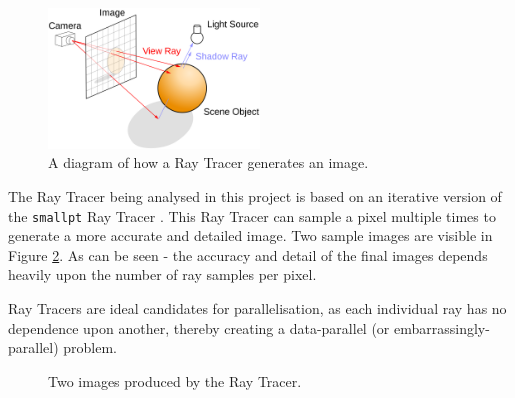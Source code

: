 \documentclass[journal,transmag]{IEEEtran}
\begin{document}
		\begin{figure}[h]
			\centering
			\includegraphics[width = 0.5\textwidth]{raytracerDiagram}
			\caption{A diagram of how a Ray Tracer generates an image.}
			\label{fig_ray_tracer_diagram}
		\end{figure}
	
		The Ray Tracer being analysed in this project is based on an iterative version of the \texttt{smallpt} Ray Tracer \cite{smallptG75:online}. This Ray Tracer can sample a pixel multiple times to generate a more accurate and detailed image. Two sample images are visible in Figure \ref{fig_ray_traced_images}. As can be seen - the accuracy and detail of the final images depends heavily upon the number of ray samples per pixel.
		
		Ray Tracers are ideal candidates for parallelisation, as each individual ray has no dependence upon another, thereby creating a data-parallel (or embarrassingly-parallel) problem.
		
		\begin{figure}[]
			\centering
			\hfil
			\caption{Two images produced by the Ray Tracer.}
			\label{fig_ray_traced_images}
		\end{figure}
		
\end{document}
